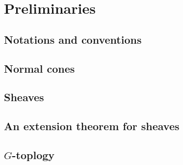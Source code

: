 \chapter{Preliminaries}
\section{Notations and conventions}
\section{Normal cones}
\section{Sheaves}
\section{An extension theorem for sheaves}
\section{$G$-toplogy}